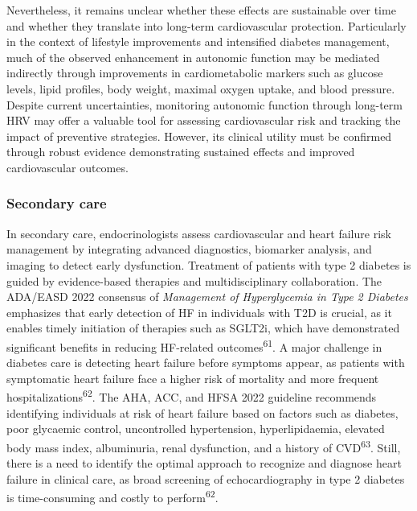 \documentclass[
  a4paper,
  headsepline=true,
  open=any]{scrbook}
\begin{document}
Nevertheless, it remains unclear whether these effects are sustainable
over time and whether they translate into long-term cardiovascular
protection. Particularly in the context of lifestyle improvements and
intensified diabetes management, much of the observed enhancement in
autonomic function may be mediated indirectly through improvements in
cardiometabolic markers such as glucose levels, lipid profiles, body
weight, maximal oxygen uptake, and blood pressure. Despite current
uncertainties, monitoring autonomic function through long-term HRV may
offer a valuable tool for assessing cardiovascular risk and tracking the
impact of preventive strategies. However, its clinical utility must be
confirmed through robust evidence demonstrating sustained effects and
improved cardiovascular outcomes.

\hypertarget{secondary-care}{%
\subsubsection{Secondary care}\label{secondary-care}}

In secondary care, endocrinologists assess cardiovascular and heart
failure risk management by integrating advanced diagnostics, biomarker
analysis, and imaging to detect early dysfunction. Treatment of patients
with type 2 diabetes is guided by evidence-based therapies and
multidisciplinary collaboration. The ADA/EASD 2022 consensus of
\emph{Management of Hyperglycemia in Type 2 Diabetes} emphasizes that
early detection of HF in individuals with T2D is crucial, as it enables
timely initiation of therapies such as SGLT2i, which have demonstrated
significant benefits in reducing HF-related
outcomes\textsuperscript{61}. A major challenge in diabetes care is
detecting heart failure before symptoms appear, as patients with
symptomatic heart failure face a higher risk of mortality and more
frequent hospitalizations\textsuperscript{62}. The AHA, ACC, and HFSA
2022 guideline recommends identifying individuals at risk of heart
failure based on factors such as diabetes, poor glycaemic control,
uncontrolled hypertension, hyperlipidaemia, elevated body mass index,
albuminuria, renal dysfunction, and a history of
CVD\textsuperscript{63}. Still, there is a need to identify the optimal
approach to recognize and diagnose heart failure in clinical care, as
broad screening of echocardiography in type 2 diabetes is time-consuming
and costly to perform\textsuperscript{62}.
\end{document}
